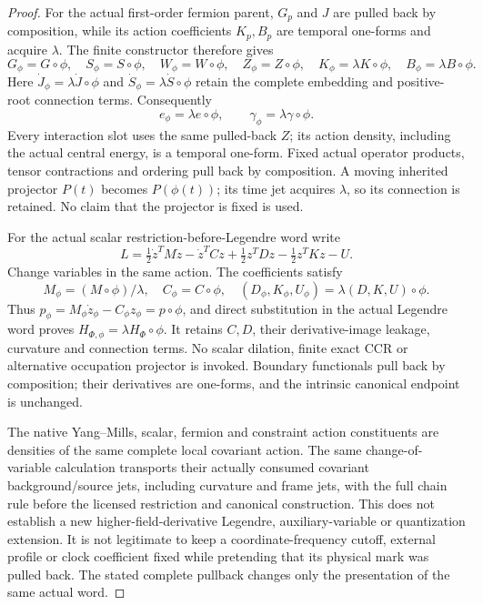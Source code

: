 \documentclass[12pt,a4paper]{article}
\begin{document}
\begin{proof}
For the actual first-order fermion parent, $G_p$ and $J$ are pulled back
by composition, while its action coefficients $K_p,B_p$ are temporal
one-forms and acquire $\lambda$. The finite constructor therefore gives
\[
 G_\phi=G\circ\phi,\quad S_\phi=S\circ\phi,
 \quad W_\phi=W\circ\phi,\quad Z_\phi=Z\circ\phi,
 \quad K_\phi=\lambda K\circ\phi,
 \quad B_\phi=\lambda B\circ\phi.
\]
Here $\dot J_\phi=\lambda\dot J\circ\phi$ and
$\dot S_\phi=\lambda\dot S\circ\phi$ retain the complete embedding
and positive-root connection terms. Consequently
\[
 e_\phi=\lambda e\circ\phi,\qquad
 \gamma_\phi=\lambda\gamma\circ\phi.
\]
Every interaction slot uses the same pulled-back $Z$; its action density,
including the actual central energy, is a temporal one-form. Fixed actual
operator products, tensor contractions and ordering pull back by
composition. A moving inherited projector $P(t)$ becomes $P(\phi(t))$;
its time jet acquires $\lambda$, so its connection is retained. No
claim that the projector is fixed is used.

For the actual scalar restriction-before-Legendre word write
\[
 L=\tfrac12\dot z^TM\dot z-\dot z^TCz
   +\tfrac12z^TDz-\tfrac12z^TKz-U.
\]
Change variables in the same action. The coefficients satisfy
\[
 M_\phi=(M\circ\phi)/\lambda,\quad C_\phi=C\circ\phi,
 \quad (D_\phi,K_\phi,U_\phi)=
 \lambda(D,K,U)\circ\phi.
\]
Thus $p_\phi=M_\phi\dot z_\phi-C_\phi z_\phi=p\circ\phi$, and
direct substitution in the actual Legendre word proves
$H_{\Phi,\phi}=\lambda H_\Phi\circ\phi$. It retains $C,D$, their
derivative-image leakage, curvature and connection terms. No scalar
dilation, finite exact CCR or alternative occupation projector is invoked.
Boundary functionals pull back by composition; their derivatives are
one-forms, and the intrinsic canonical endpoint is unchanged.

The native Yang--Mills, scalar, fermion and constraint action constituents
are densities of the same complete local covariant action. The same
change-of-variable calculation transports their actually consumed
covariant background/source jets, including curvature and frame jets,
with the full chain rule before the licensed restriction and canonical
construction. This does not establish a new higher-field-derivative
Legendre, auxiliary-variable or quantization extension. It is not legitimate to keep a
coordinate-frequency cutoff, external profile or clock coefficient fixed
while pretending that its physical mark was pulled back. The stated
complete pullback changes only the presentation of the same actual word.
\end{proof}
\end{document}
